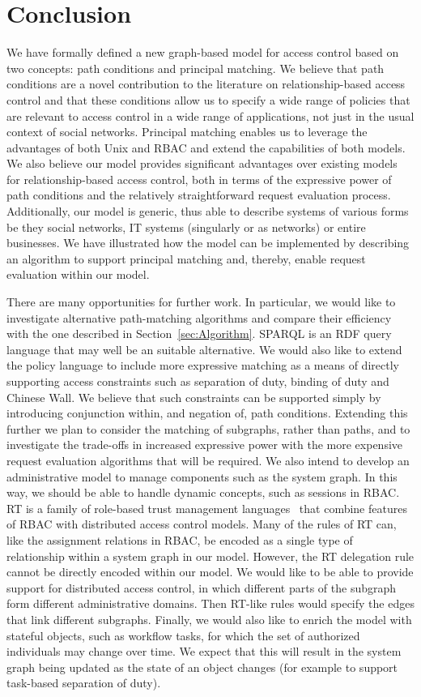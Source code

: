 \documentclass{article}
\begin{document}
\section{Conclusion}\label{sec:Conclusion}

We have formally defined a new graph-based model for access control based on two concepts: path conditions and principal matching.
We believe that path conditions are a novel contribution to the literature on relationship-based access control and that these conditions allow us to specify a wide range of policies that are relevant to access control in a wide range of applications, not just in the usual context of social networks.
Principal matching enables us to leverage the advantages of both Unix and RBAC and extend the capabilities of both models.
We also believe our model provides significant advantages over existing models for relationship-based access control, both in terms of the expressive power of path conditions and the relatively straightforward request evaluation process.
Additionally, our model is generic, thus able to describe systems of various forms be they social networks, IT systems (singularly or as networks) or entire businesses.
We have illustrated how the model can be implemented by describing an algorithm to support principal matching and, thereby, enable request evaluation within our model.

There are many opportunities for further work.
In particular, we would like to investigate alternative path-matching algorithms and compare their efficiency with the one described in Section~\ref{sec:Algorithm}.
SPARQL is an RDF query language that may well be an suitable alternative.
We would also like to extend the policy language to include more expressive matching as a means of directly supporting access constraints such as separation of duty, binding of duty and Chinese Wall.
We believe that such constraints can be supported simply by introducing conjunction within, and negation of, path conditions.
Extending this further we plan to consider the matching of subgraphs, rather than paths, and to investigate the trade-offs in increased expressive power with the more expensive request evaluation algorithms that will be required.
We also intend to develop an administrative model to manage components such as the system graph.
In this way, we should be able to handle dynamic concepts, such as sessions in RBAC.
RT is a family of role-based trust management languages~\cite{LiMiWi02} that combine features of RBAC with distributed access control models.
Many of the rules of RT can, like the assignment relations in RBAC, be encoded as a single type of relationship within a system graph in our model.
However, the RT delegation rule  cannot be directly encoded within our model.
We would like to be able to provide support for distributed access control, in which different parts of the subgraph form different administrative domains.
Then RT-like rules would specify the edges that link different subgraphs.
Finally, we would also like to enrich the model with stateful objects, such as workflow tasks, for which the set of authorized individuals may change over time.
We expect that this will result in the system graph being updated as the state of an object changes (for example to support task-based separation of duty).
\end{document}

